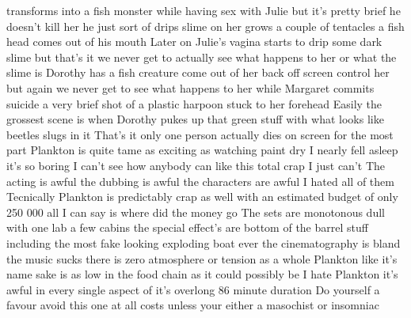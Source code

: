 \documentclass{article}
\begin{document}
\begin{itemize}
\begin{itemize}
transforms into a fish monster while having sex with Julie but it's pretty brief   he doesn't kill her  he just sort of drips slime on her  grows a couple of tentacles   a fish head comes out of his mouth  Later on Julie's vagina starts to drip some dark slime but that's it  we never get to actually see what happens to her or what the slime is  Dorothy has a fish creature come out of her back  off screen    control her but again we never get to see what happens to her while Margaret commits suicide  a very brief shot of a plastic harpoon stuck to her forehead  Easily the grossest scene is when Dorothy pukes up that green stuff with what looks like beetles   slugs in it  That's it  only one person actually dies on screen   for the most part Plankton is quite tame   as exciting as watching paint dry   I nearly fell asleep it's so boring  I can't see how anybody can like this total crap  I just can't  The acting is awful  the dubbing is awful  the characters are awful   I hated all of them  Tecnically Plankton is predictably crap as well  with an estimated budget of only  250 000 all I can say is where did the money go  The sets are monotonous   dull with one lab   a few cabins  the special effect's are bottom of the barrel stuff including the most fake looking exploding boat ever  the cinematography is bland  the music sucks there is zero atmosphere or tension   as a whole Plankton  like it's name sake  is as low in the food chain as it could possibly be  I hate Plankton  it's awful in every single aspect of it's overlong 86 minute duration  Do yourself a favour   avoid this one at all costs unless your either a masochist or insomniac
	\end{itemize}
\end{itemize}
\end{document}
